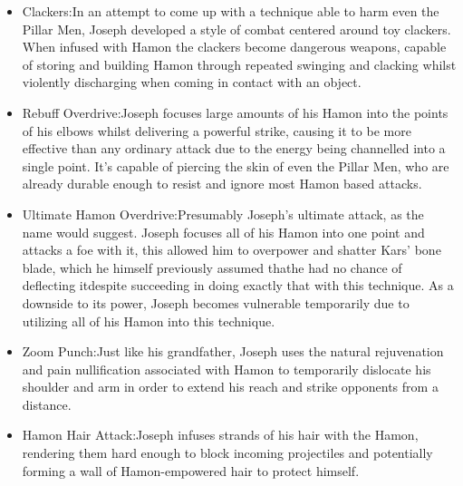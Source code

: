 \documentclass[a4paper,12pt]{article}
\begin{document}
\begin{itemize}
\item Clackers:In an attempt to come up with a technique able to harm even the Pillar Men, Joseph developed a style of combat centered around toy clackers. When infused with Hamon the clackers become dangerous weapons, capable of storing and building Hamon through repeated swinging and clacking whilst violently discharging when coming in contact with an object.
\item Rebuff Overdrive:Joseph focuses large amounts of his Hamon into the points of his elbows whilst delivering a powerful strike, causing it to be more effective than any ordinary attack due to the energy being channelled into a single point. It's capable of piercing the skin of even the Pillar Men, who are already durable enough to resist and ignore most Hamon based attacks.
\item Ultimate Hamon Overdrive:Presumably Joseph's ultimate attack, as the name would suggest. Joseph focuses all of his Hamon into one point and attacks a foe with it, this allowed him to overpower and shatter Kars' bone blade, which he himself previously assumed thathe had no chance of deflecting itdespite succeeding in doing exactly that with this technique. As a downside to its power, Joseph becomes vulnerable temporarily due to utilizing all of his Hamon into this technique.
\item Zoom Punch:Just like his grandfather, Joseph uses the natural rejuvenation and pain nullification associated with Hamon to temporarily dislocate his shoulder and arm in order to extend his reach and strike opponents from a distance.
\item Hamon Hair Attack:Joseph infuses strands of his hair with the Hamon, rendering them hard enough to block incoming projectiles and potentially forming a wall of Hamon-empowered hair to protect himself.
\end{itemize}\\ \par \vspace{0.5cm}
\end{document}
